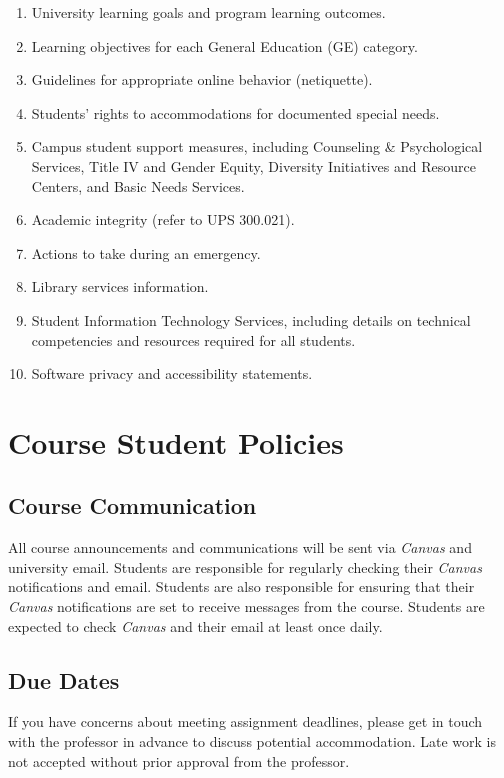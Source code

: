 \documentclass[10pt, letterpaper]{article}
\begin{document}
\begin{enumerate}
    \item   University learning goals and program learning outcomes.
    \item	Learning objectives for each General Education (GE) category.
    \item	Guidelines for appropriate online behavior (netiquette).
    \item	Students’ rights to accommodations for documented special needs.
    \item   Campus student support measures, including Counseling \& Psychological Services, Title IV and Gender Equity, Diversity Initiatives and Resource Centers, and Basic Needs Services.
    \item	Academic integrity (refer to UPS 300.021).
    \item	Actions to take during an emergency.
    \item	Library services information.
    \item	Student Information Technology Services, including details on technical competencies and resources required for all students.
    \item	Software privacy and accessibility statements.
\end{enumerate}

\section*{Course Student Policies}

\subsection*{Course Communication}
All course announcements and communications will be sent via \emph{Canvas} and university email. Students are responsible for regularly checking their \emph{Canvas} notifications and email. Students are also responsible for ensuring that their \emph{Canvas} notifications are set to receive messages from the course. Students are expected to check \emph{Canvas} and their email at least once daily.

\subsection*{Due Dates}
If you have concerns about meeting assignment deadlines, please get in touch with the professor in advance to discuss potential accommodation. Late work is not accepted without prior approval from the professor.
\end{document}

